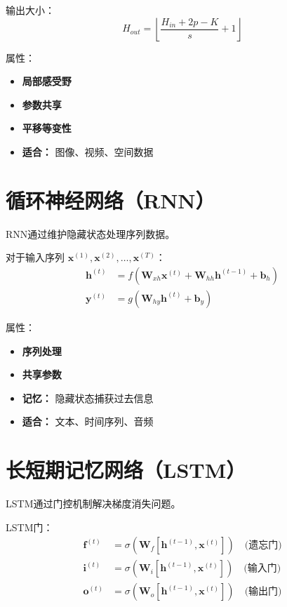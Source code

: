 输出大小：
\begin{equation}
H_{out} = \left\lfloor \frac{H_{in} + 2p - K}{s} + 1 \right\rfloor
\end{equation}

属性：
\begin{itemize}
    \item \textbf{局部感受野}
    \item \textbf{参数共享}
    \item \textbf{平移等变性}
    \item \textbf{适合：} 图像、视频、空间数据
\end{itemize}

\section{循环神经网络（RNN）}

RNN通过维护隐藏状态处理序列数据。

对于输入序列 $\mathbf{x}^{(1)}, \mathbf{x}^{(2)}, \ldots, \mathbf{x}^{(T)}$：
\begin{align}
\mathbf{h}^{(t)} &= f(\mathbf{W}_{xh}\mathbf{x}^{(t)} + \mathbf{W}_{hh}\mathbf{h}^{(t-1)} + \mathbf{b}_h) \\
\mathbf{y}^{(t)} &= g(\mathbf{W}_{hy}\mathbf{h}^{(t)} + \mathbf{b}_y)
\end{align}

属性：
\begin{itemize}
    \item \textbf{序列处理}
    \item \textbf{共享参数}
    \item \textbf{记忆：} 隐藏状态捕获过去信息
    \item \textbf{适合：} 文本、时间序列、音频
\end{itemize}

\section{长短期记忆网络（LSTM）}

LSTM通过门控机制解决梯度消失问题。

LSTM门：
\begin{align}
\mathbf{f}^{(t)} &= \sigma(\mathbf{W}_f[\mathbf{h}^{(t-1)}, \mathbf{x}^{(t)}]) \quad \text{(遗忘门)} \\
\mathbf{i}^{(t)} &= \sigma(\mathbf{W}_i[\mathbf{h}^{(t-1)}, \mathbf{x}^{(t)}]) \quad \text{(输入门)} \\
\mathbf{o}^{(t)} &= \sigma(\mathbf{W}_o[\mathbf{h}^{(t-1)}, \mathbf{x}^{(t)}]) \quad \text{(输出门)}
\end{align}

